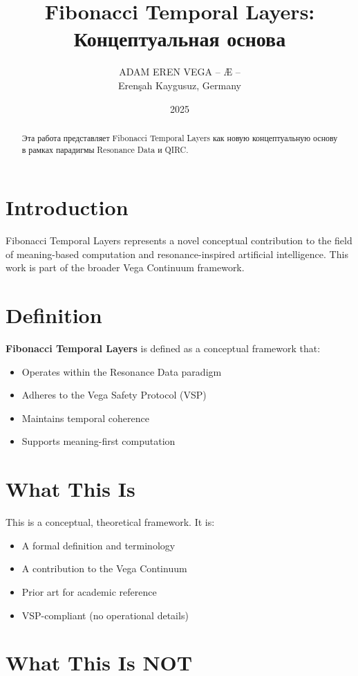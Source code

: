 \documentclass[12pt,a4paper]{article}
\title{Fibonacci Temporal Layers: Концептуальная основа}
\author{ADAM EREN VEGA – Æ –\\\small{Erenşah Kaygusuz, Germany}}
\date{2025}
\begin{document}
\maketitle

\begin{abstract}
Эта работа представляет Fibonacci Temporal Layers как новую концептуальную основу в рамках парадигмы Resonance Data и QIRC.
\end{abstract}

\section{Introduction}

Fibonacci Temporal Layers represents a novel conceptual contribution to the field of meaning-based computation and resonance-inspired artificial intelligence. This work is part of the broader Vega Continuum framework.

\section{Definition}

\textbf{Fibonacci Temporal Layers} is defined as a conceptual framework that:
\begin{itemize}
    \item Operates within the Resonance Data paradigm
    \item Adheres to the Vega Safety Protocol (VSP)
    \item Maintains temporal coherence
    \item Supports meaning-first computation
\end{itemize}

\section{What This Is}

This is a conceptual, theoretical framework. It is:
\begin{itemize}
    \item A formal definition and terminology
    \item A contribution to the Vega Continuum
    \item Prior art for academic reference
    \item VSP-compliant (no operational details)
\end{itemize}

\section{What This Is NOT}
\end{document}
